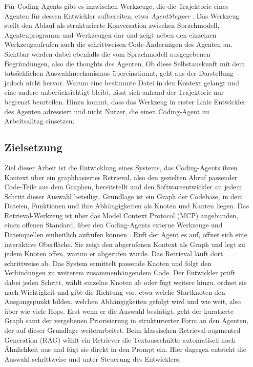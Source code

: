 Für Coding-Agents gibt es inzwischen Werkzeuge, die die Trajektorie eines Agenten für dessen 
Entwickler aufbereiten, etwa \textit{AgentStepper} \parencite{agentstepper2026}. Das Werkzeug stellt den Ablauf
als strukturierte Konversation zwischen Sprachmodell, Agentenprogramm und Werkzeugen dar und zeigt neben 
den einzelnen Werkzeugaufrufen auch die schrittweisen Code-Änderungen des Agenten an. Sichtbar
werden dabei ebenfalls die vom Sprachmodell ausgegebenen Begründungen, also die thoughts des Agenten. Ob
diese Selbstauskunft mit dem tatsächlichen Auswahlmechanismus übereinstimmt, geht aus der
Darstellung jedoch nicht hervor. Warum eine bestimmte Datei in den Kontext gelangt und eine andere
unberücksichtigt bleibt, lässt sich anhand der Trajektorie nur begrenzt beurteilen. Hinzu kommt,
dass das Werkzeug in erster Linie Entwickler des Agenten adressiert und nicht Nutzer, die einen
Coding-Agent im Arbeitsalltag einsetzen.

\subsection{Zielsetzung}

Ziel dieser Arbeit ist die Entwicklung eines Systems, das Coding-Agents ihren Kontext über ein graphbasiertes Retrieval, also den gezielten Abruf passender Code-Teile aus dem Graphen, bereitstellt und den Softwareentwickler an jedem Schritt dieser Auswahl beteiligt. Grundlage ist ein Graph der Codebase, in dem Dateien, Funktionen und ihre Abhängigkeiten als Knoten und Kanten liegen. Das Retrieval-Werkzeug ist über das Model Context Protocol (MCP) angebunden, einen offenen Standard, über den Coding-Agents externe Werkzeuge und Datenquellen einheitlich aufrufen können \parencite{anthropic2024mcp}. Ruft der Agent es auf, öffnet sich eine interaktive Oberfläche. Sie zeigt den abgerufenen Kontext als Graph und legt zu jedem Knoten offen, warum er abgerufen wurde. Das Retrieval läuft dort schrittweise ab. Das System ermittelt passende Knoten und folgt den Verbindungen zu weiterem zusammenhängendem Code. Der Entwickler prüft dabei jeden Schritt, wählt einzelne Knoten ab oder fügt weitere hinzu, ordnet sie nach Wichtigkeit und gibt die Richtung vor, etwa welche Startknoten den Ausgangspunkt bilden, welchen Abhängigkeiten gefolgt wird und wie weit, also über wie viele Hops. Erst wenn er die Auswahl bestätigt, geht der kuratierte Graph samt der vergebenen Priorisierung in strukturierter Form an den Agenten, der auf dieser Grundlage weiterarbeitet. Beim klassischen Retrieval-augmented Generation (RAG) wählt ein Retriever die Textausschnitte automatisch nach Ähnlichkeit aus und fügt sie direkt in den Prompt ein. Hier dagegen entsteht die Auswahl schrittweise und unter Steuerung des Entwicklers.

